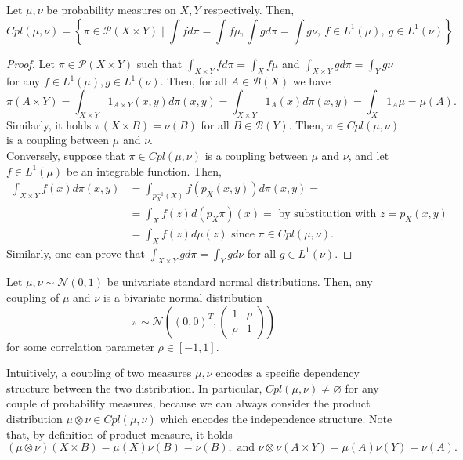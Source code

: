 \documentclass[../main.tex]{subfiles}
\begin{document}
\begin{proposition}
\label{prop:characterization_cpl}
    Let $\mu, \nu$ be probability measures on $X, Y$ respectively. Then,
    $$
    Cpl(\mu, \nu) = 
    \left\{\pi\in\mathcal{P}(X\times Y) \mid \int f d\pi = \int f\mu,
    \int g d\pi = \int g\nu, \ f\in L^1(\mu), \ g\in L^1(\nu)\right\}
    $$
\end{proposition}
\begin{proof}
    Let $\pi\in\mathcal{P}(X\times Y)$ such that $\int_{X\times Y} f d\pi = \int_X f\mu$ and $ \int_{X\times Y} g d\pi = \int_Y g\nu$ for any $f\in L^1(\mu), g\in L^1(\nu)$. Then, for all $A\in\mathcal{B}(X)$ we have
    $$
    \pi(A\times Y) 
    = \int_{X\times Y} 1_{A\times Y}(x,y)d\pi(x,y) 
    = \int_{X\times Y} 1_A(x)d\pi(x,y)
    = \int_X 1_A \mu
    = \mu(A).
    $$
    Similarly, it holds $\pi(X\times B) = \nu(B)$ for all $B\in\mathcal{B}(Y)$. Then, $\pi\in Cpl(\mu, \nu)$ is a coupling between $\mu$ and $\nu$. \\
    Conversely, suppose that $\pi\in Cpl(\mu, \nu)$ is a coupling between $\mu$ and $\nu$, and let $f\in L^1(\mu)$ be an integrable function. Then, 
    \begin{align*}
        \int_{X\times Y} f(x) d\pi(x,y) 
        &= \int_{p^{-1}_X(X)} f(p_X(x,y)) d\pi(x,y) = \\
        &= \int_X f(z) d(p_X\pi)(x) = \text{ by substitution with } z = p_X(x,y) \\
        &= \int_X f(z) d\mu(z) \text{ since } \pi\in Cpl(\mu, \nu).
    \end{align*}
    Similarly, one can prove that $\int_{X\times Y} gd\pi = \int_Y gd\nu$ for all $g\in L^1(\nu)$.
\end{proof}

\begin{example}
    Let $\mu, \nu\sim\mathcal{N}(0,1)$ be univariate standard normal distributions. Then, any coupling of $\mu$ and $\nu$ is a bivariate normal distribution $$\pi\sim\mathcal{N}\left((0,0)^T, \begin{pmatrix}1 & \rho \\ \rho & 1\end{pmatrix}\right)$$ for some correlation parameter $\rho\in[-1, 1]$.
\end{example}

\begin{remark}
    Intuitively, a coupling of two measures $\mu, \nu$ encodes a specific dependency structure between the two distribution. In particular, $Cpl(\mu, \nu)\neq\varnothing$ for any couple of probability measures, because we can always consider the product distribution $\mu\otimes\nu\in Cpl(\mu, \nu)$ which encodes the independence structure. Note that, by definition of product measure, it holds
    $$
    (\mu\otimes\nu)(X\times B) = \mu(X)\nu(B)=\nu(B), \text{ and } \nu\otimes\nu(A\times Y) = \mu(A)\nu(Y)=\nu(A).
    $$
\end{remark}
\end{document}
